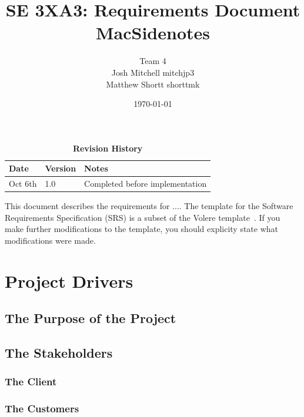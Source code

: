 \documentclass[12pt, titlepage]{article}
\title{SE 3XA3: Requirements Document\\MacSidenotes}
\author{Team 4
		\\ Josh Mitchell mitchjp3
		\\ Matthew Shortt shorttmk
}
\date{\today}
\begin{document}
\maketitle

\tableofcontents
\listoftables
\listoffigures



\begin{table}[bp]
\caption{\bf Revision History}
\begin{tabularx}{\textwidth}{p{3cm}p{2cm}X}
\toprule {\bf Date} & {\bf Version} & {\bf Notes}\\
\midrule
Oct 6th & 1.0 & Completed before implementation\\
\bottomrule
\end{tabularx}
\end{table}

\newpage



This document describes the requirements for ....  The template for the Software
Requirements Specification (SRS) is a subset of the Volere
template~\citep{RobertsonAndRobertson2012}.  If you make further modifications
to the template, you should explicity state what modifications were made.

\section{Project Drivers}

\subsection{The Purpose of the Project}

\subsection{The Stakeholders}

\subsubsection{The Client}

\subsubsection{The Customers}
\end{document}
